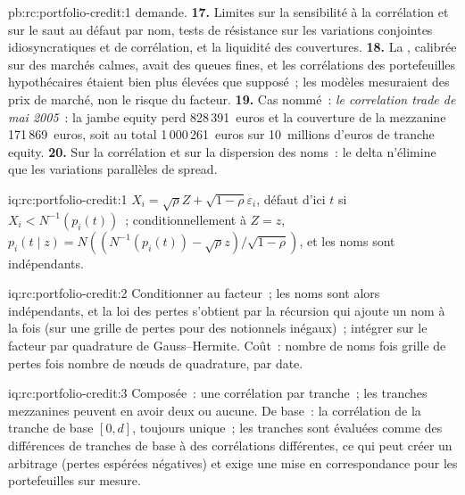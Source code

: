 \begin{solution}{pb:rc:portfolio-credit:1}
demande.
\textbf{17.} Limites sur la sensibilité à la corrélation et sur le saut au défaut par nom, tests
de résistance sur les variations conjointes idiosyncratiques et de corrélation, et la liquidité des couvertures.
\textbf{18.} La , calibrée sur des marchés calmes, avait des queues fines, et
les corrélations des portefeuilles hypothécaires étaient bien plus élevées que supposé~; les modèles mesuraient
des prix de marché, non le risque du facteur.
\textbf{19.} Cas nommé~: \emph{le correlation trade de mai 2005}~: la jambe equity perd
828\,391~euros et la couverture de la mezzanine 171\,869~euros, soit au total 1\,000\,261~euros sur
10~millions d'euros de tranche equity.
\textbf{20.} Sur la corrélation et sur la dispersion des noms~: le delta n'élimine que les
variations parallèles de spread.
\end{solution}

\begin{solution}{iq:rc:portfolio-credit:1}
$X_i = \sqrt\rho Z+\sqrt{1-\rho}\varepsilon_i$, défaut d'ici $t$ si $X_i < N^{-1}(p_i(t))$~;
conditionnellement à $Z = z$, $p_i(t\mid z) = N((N^{-1}(p_i(t))-\sqrt\rho z)/\sqrt{1-\rho})$, et
les noms sont indépendants.
\end{solution}

\begin{solution}{iq:rc:portfolio-credit:2}
Conditionner au facteur~; les noms sont alors indépendants, et la loi des pertes
s'obtient par la récursion qui ajoute un nom à la fois (sur une grille de pertes pour des notionnels inégaux)~;
intégrer sur le facteur par quadrature de Gauss--Hermite. Coût~: nombre de noms fois grille de pertes fois
nombre de nœuds de quadrature, par date.
\end{solution}

\begin{solution}{iq:rc:portfolio-credit:3}
Composée~: une corrélation par tranche~; les tranches mezzanines peuvent en avoir deux ou aucune. De base~: la
corrélation de la tranche de base $[0,d]$, toujours unique~; les tranches sont évaluées comme des différences de
tranches de base à des corrélations différentes, ce qui peut créer un arbitrage (pertes espérées négatives) et
exige une mise en correspondance pour les portefeuilles sur mesure.
\end{solution}

